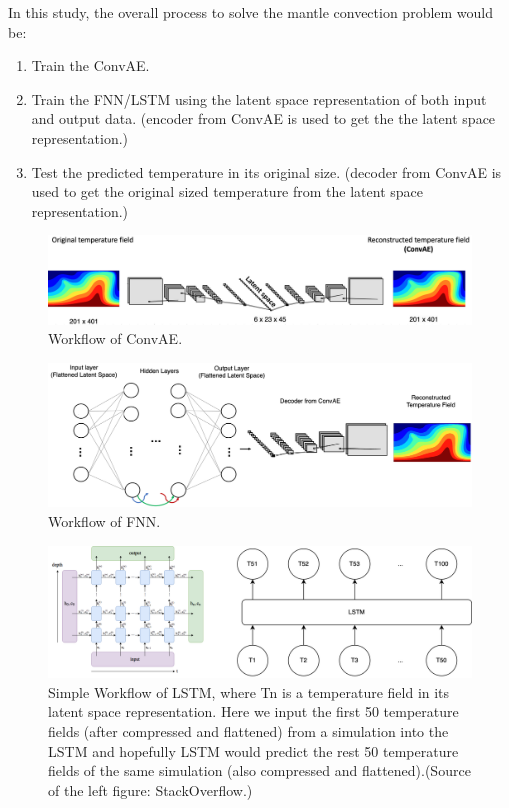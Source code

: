 In this study, the overall process to solve the mantle convection problem would be: 

\begin{enumerate}
  \item Train the ConvAE.
  \item Train the FNN/LSTM using the latent space representation of both input and output data. (encoder from ConvAE is used to get the the latent space representation.)
  \item Test the predicted temperature in its original size. (decoder from ConvAE is used to get the original sized temperature from the latent space representation.)
\end{enumerate}

\begin{figure}[H]
    \centering
    \caption{Workflow of ConvAE.}
    \includegraphics[scale=0.3]{figures/mantle_convection_images/ConvAE_workflow.png}
\end{figure}

\begin{figure}[H]
    \centering
    \caption{Workflow of FNN.}
    \includegraphics[scale=0.4]{figures/mantle_convection_images/FNN_workflow.png}
\end{figure}

\begin{figure}[H]
    \centering
    \caption{Simple Workflow of LSTM, where Tn is a temperature field in its latent space representation. Here we input the first 50 temperature fields (after compressed and flattened) from a simulation into the LSTM and hopefully LSTM would predict the rest 50 temperature fields of the same simulation (also compressed and flattened).(Source of the left figure: StackOverflow.)}
    \includegraphics[scale=0.6]{figures/mantle_convection_images/LSTM_workflow.png}
\end{figure}

